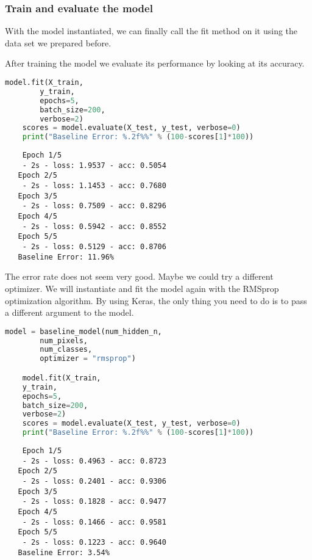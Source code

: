 \subsubsection{Train and evaluate the model}

With the model instantiated, we can finally call the fit method on it using the data set we prepared before.

After training the model we evaluate its performance by looking at its accuracy.

\begin{lstlisting}[language=Python]
    model.fit(X_train,
        y_train, 
        epochs=5,
        batch_size=200,
        verbose=2)
    scores = model.evaluate(X_test, y_test, verbose=0)
    print("Baseline Error: %.2f%%" % (100-scores[1]*100))
\end{lstlisting}

\begin{lstlisting}
    Epoch 1/5
    - 2s - loss: 1.9537 - acc: 0.5054
   Epoch 2/5
    - 2s - loss: 1.1453 - acc: 0.7680
   Epoch 3/5
    - 2s - loss: 0.7509 - acc: 0.8296
   Epoch 4/5
    - 2s - loss: 0.5942 - acc: 0.8552
   Epoch 5/5
    - 2s - loss: 0.5129 - acc: 0.8706
   Baseline Error: 11.96%
\end{lstlisting}

The error rate does not seem very good. Maybe we could try a different optimizer. We will instantiate and fit the model again with the RMSprop optimization algorithm. By using Keras, the only thing you need to do is to pass a different argument to the model.

\begin{lstlisting}[language=Python]
    model = baseline_model(num_hidden_n,
        num_pixels,
        num_classes,
        optimizer = "rmsprop")

    model.fit(X_train,
    y_train, 
    epochs=5,
    batch_size=200,
    verbose=2)
    scores = model.evaluate(X_test, y_test, verbose=0)
    print("Baseline Error: %.2f%%" % (100-scores[1]*100))
\end{lstlisting}

\begin{lstlisting}
    Epoch 1/5
    - 2s - loss: 0.4963 - acc: 0.8723
   Epoch 2/5
    - 2s - loss: 0.2401 - acc: 0.9306
   Epoch 3/5
    - 2s - loss: 0.1828 - acc: 0.9477
   Epoch 4/5
    - 2s - loss: 0.1466 - acc: 0.9581
   Epoch 5/5
    - 2s - loss: 0.1223 - acc: 0.9640
   Baseline Error: 3.54%   
\end{lstlisting}

